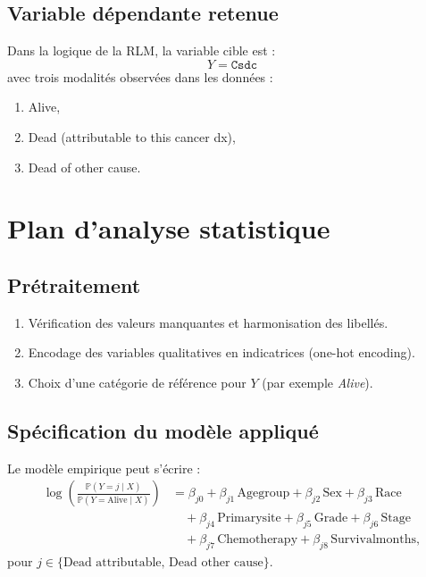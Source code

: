 \documentclass[12pt,a4paper]{article}
\begin{document}
\begin{itemize}
\subsection{Variable dépendante retenue}
Dans la logique de la RLM, la variable cible est :
\begin{equation*}
Y = \texttt{Csdc}
\end{equation*}
avec trois modalités observées dans les données :
\begin{enumerate}[label=\arabic*.]
    \item Alive,
    \item Dead (attributable to this cancer dx),
    \item Dead of other cause.
\end{enumerate}

\section{Plan d'analyse statistique}
\subsection{Prétraitement}
\begin{enumerate}[label=\arabic*.]
    \item Vérification des valeurs manquantes et harmonisation des libellés.
    \item Encodage des variables qualitatives en indicatrices (one-hot encoding).
    \item Choix d'une catégorie de référence pour $Y$ (par exemple \textit{Alive}).
\end{enumerate}

\subsection{Spécification du modèle appliqué}
Le modèle empirique peut s'écrire :
\begin{align}
\log\left(\frac{\mathbb{P}(Y=j\mid X)}{\mathbb{P}(Y=\text{Alive}\mid X)}\right)
&= \beta_{j0} + \beta_{j1}\,\text{Agegroup} + \beta_{j2}\,\text{Sex} + \beta_{j3}\,\text{Race} \\
&\quad + \beta_{j4}\,\text{Primarysite} + \beta_{j5}\,\text{Grade} + \beta_{j6}\,\text{Stage} \\
&\quad + \beta_{j7}\,\text{Chemotherapy} + \beta_{j8}\,\text{Survivalmonths},
\end{align}
pour $j \in \{\text{Dead attributable},\,\text{Dead other cause}\}$.


\end{itemize}
\end{document}
